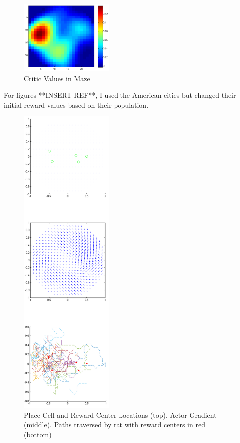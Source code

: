 \documentclass[conference]{IEEEtran}
\begin{document}
\begin{figure}
\includegraphics[width=0.4\textwidth]{waterMazeRevised2_Critic_populationRewards.png} 
\caption{Critic Values in Maze}
\end{figure}

For figures **INSERT REF**, I used the American cities but changed their initial reward values based on their population. 

\begin{figure}
\includegraphics[width=0.4\textwidth]{waterMazeRevisedD_Figure_populationRewards.png} 
\caption{Place Cell and Reward Center Locations (top). Actor Gradient (middle). Paths traversed by rat with reward centers in red (bottom)}
\end{figure}
\end{document}
